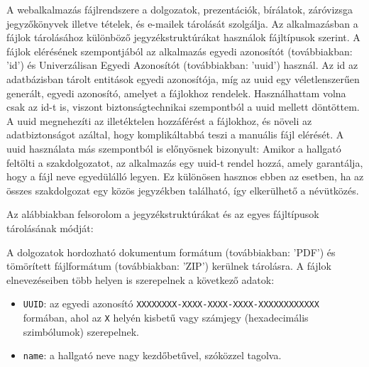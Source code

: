 
A webalkalmazás fájlrendszere a dolgozatok, prezentációk, bírálatok, záróvizsga jegyzőkönyvek illetve tételek, és e-mailek tárolását szolgálja. Az alkalmazásban a fájlok tárolásához különböző jegyzékstruktúrákat használok  fájltípusok szerint. A fájlok elérésének szempontjából az alkalmazás egyedi azonosítót (továbbiakban: 'id') és Univerzálisan Egyedi Azonosítót (továbbiakban: 'uuid') használ. Az id az adatbázisban tárolt entitások egyedi azonosítója, míg az uuid egy véletlenszerűen generált, egyedi azonosító, amelyet a fájlokhoz rendelek. Használhattam volna csak az id-t is, viszont biztonságtechnikai szempontból a uuid mellett döntöttem. A uuid megnehezíti az illetéktelen hozzáférést a fájlokhoz, és növeli az adatbiztonságot azáltal, hogy komplikáltabbá teszi a manuális fájl elérését. A uuid használata más szempontból is előnyösnek bizonyult: Amikor a hallgató feltölti a szakdolgozatot, az alkalmazás egy uuid-t rendel hozzá, amely garantálja, hogy a fájl neve egyedülálló legyen. Ez különösen hasznos ebben az esetben, ha az összes szakdolgozat egy közös jegyzékben található, így elkerülhető a névütközés.

Az alábbiakban felsorolom a jegyzékstruktúrákat és az egyes fájltípusok tárolásának módját:

A dolgozatok hordozható dokumentum formátum (továbbiakban: 'PDF') és tömörített fájlformátum (továbbiakban: 'ZIP') kerülnek tárolásra. A fájlok elnevezéseiben több helyen is szerepelnek a következő adatok:

\begin{itemize}
\item \texttt{UUID}: az egyedi azonosító \texttt{XXXXXXXX-XXXX-XXXX-XXXX-XXXXXXXXXXXX} formában, ahol az \texttt{X} helyén kisbetű vagy számjegy (hexadecimális szimbólumok) szerepelnek.

\item \texttt{name}: a hallgató neve nagy kezdőbetűvel, szóközzel tagolva.
\end{itemize}


